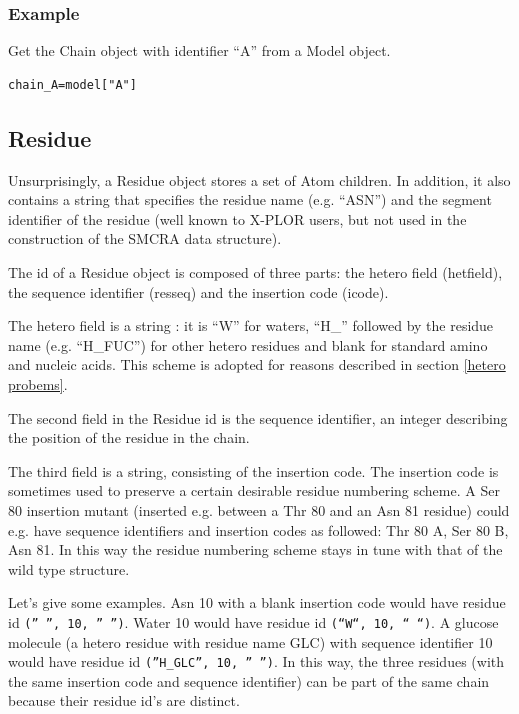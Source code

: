 \documentclass{report}
\begin{document}
\subsubsection{Example}

Get the Chain object with identifier {}``A{}'' from a Model object.

\begin{verbatim}
chain_A=model["A"]
\end{verbatim}

\subsection{Residue}

Unsurprisingly, a Residue object stores a set of Atom children. In addition,
it also contains a string that specifies the residue name (e.g. {}``ASN{}'')
and the segment identifier of the residue (well known to X-PLOR users, but not
used in the construction of the SMCRA data structure).

The id of a Residue object is composed of three parts: the hetero field (hetfield),
the sequence identifier (resseq) and the insertion code (icode).

The hetero field is a string : it is {}``W{}'' for waters, {}``H\_{}'' followed
by the residue name (e.g. {}``H\_FUC{}'') for other hetero residues and blank
for standard amino and nucleic acids. This scheme is adopted for reasons described
in section \ref{hetero probems}.

The second field in the Residue id is the sequence identifier, an integer describing
the position of the residue in the chain.

The third field is a string, consisting of the insertion code. The insertion
code is sometimes used to preserve a certain desirable residue numbering scheme.
A Ser 80 insertion mutant (inserted e.g. between a Thr 80 and an Asn 81 residue)
could e.g. have sequence identifiers and insertion codes as followed: Thr 80
A, Ser 80 B, Asn 81. In this way the residue numbering scheme stays in tune
with that of the wild type structure.

Let's give some examples. Asn 10 with a blank insertion code would have residue
id {\tt ('' '', 10, '' '')}. Water 10 would have residue id {\tt (``W``, 10, `` ``)}.
A glucose molecule (a hetero residue with residue name GLC) with sequence identifier
10 would have residue id {\tt (''H\_GLC'', 10, '' '')}. In this way, the three
residues (with the same insertion code and sequence identifier) can be part
of the same chain because their residue id's are distinct.
\end{document}
